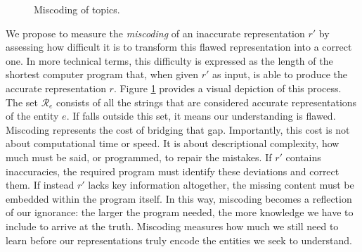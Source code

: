 \begin{figure}[t]
\centering
{}
\caption{\label{fig:miscoding}Miscoding of topics.}
\end{figure}

We propose to measure the \emph{miscoding} of an inaccurate representation $r'$ by assessing how difficult it is to transform this flawed representation into a correct one. In more technical terms, this difficulty is expressed as the length of the shortest computer program that, when given $r'$ as input, is able to produce the accurate representation $r$. Figure \ref{fig:miscoding} provides a visual depiction of this process. The set $\mathcal{R}_e$ consists of all the strings that are considered accurate representations of the entity $e$. If  falls outside this set, it means our understanding is flawed. Miscoding represents the cost of bridging that gap. Importantly, this cost is not about computational time or speed. It is about descriptional complexity, how much must be said, or programmed, to repair the mistakes. If $r'$ contains inaccuracies, the required program must identify these deviations and correct them. If instead $r'$ lacks key information altogether, the missing content must be embedded within the program itself. In this way, miscoding becomes a reflection of our ignorance: the larger the program needed, the more knowledge we have to include to arrive at the truth. Miscoding measures how much we still need to learn before our representations truly encode the entities we seek to understand.

